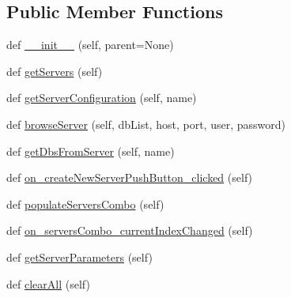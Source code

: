 \subsection*{Public Member Functions}
\begin{DoxyCompactItemize}
\item 
def \mbox{\hyperlink{class_dsg_tools_1_1_custom_widgets_1_1explore_server_widget_1_1_explore_server_widget_ae6bb6a0d26af06fb37272ed7f8f3eeb5}{\+\_\+\+\_\+init\+\_\+\+\_\+}} (self, parent=None)
\item 
def \mbox{\hyperlink{class_dsg_tools_1_1_custom_widgets_1_1explore_server_widget_1_1_explore_server_widget_a637e196dd18e352d8635b217dc8b75bf}{get\+Servers}} (self)
\item 
def \mbox{\hyperlink{class_dsg_tools_1_1_custom_widgets_1_1explore_server_widget_1_1_explore_server_widget_ae76906b263b378952f3fd1e967c83482}{get\+Server\+Configuration}} (self, name)
\item 
def \mbox{\hyperlink{class_dsg_tools_1_1_custom_widgets_1_1explore_server_widget_1_1_explore_server_widget_a7bcfcb38d11d334887e710b5c7980570}{browse\+Server}} (self, db\+List, host, port, user, password)
\item 
def \mbox{\hyperlink{class_dsg_tools_1_1_custom_widgets_1_1explore_server_widget_1_1_explore_server_widget_a7223998ba1769eabac665aa57e992ad6}{get\+Dbs\+From\+Server}} (self, name)
\item 
def \mbox{\hyperlink{class_dsg_tools_1_1_custom_widgets_1_1explore_server_widget_1_1_explore_server_widget_a58165dddfcd6d886307f10956597d52c}{on\+\_\+create\+New\+Server\+Push\+Button\+\_\+clicked}} (self)
\item 
def \mbox{\hyperlink{class_dsg_tools_1_1_custom_widgets_1_1explore_server_widget_1_1_explore_server_widget_a0f623e6eb0c758c98e1868f770f13eaf}{populate\+Servers\+Combo}} (self)
\item 
def \mbox{\hyperlink{class_dsg_tools_1_1_custom_widgets_1_1explore_server_widget_1_1_explore_server_widget_a186c7521aad3ac166a08d958abecb623}{on\+\_\+servers\+Combo\+\_\+current\+Index\+Changed}} (self)
\item 
def \mbox{\hyperlink{class_dsg_tools_1_1_custom_widgets_1_1explore_server_widget_1_1_explore_server_widget_a701ec96fe40f3535ab4c9df4bdaec972}{get\+Server\+Parameters}} (self)
\item 
def \mbox{\hyperlink{class_dsg_tools_1_1_custom_widgets_1_1explore_server_widget_1_1_explore_server_widget_ac9852a6167cf95dbcb026e2b94c0174f}{clear\+All}} (self)
\end{DoxyCompactItemize}
